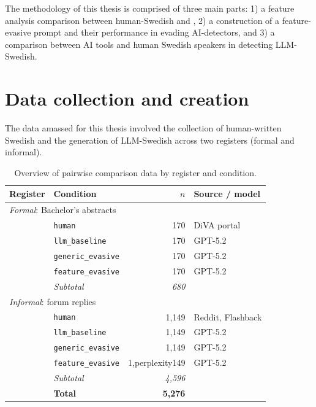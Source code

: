 \documentclass[thesis]{cluu}
\providecommand{\DIFadd}[1]{\texorpdfstring{\highLight[yellow]{#1}}{#1}} %
\providecommand{\DIFadd}[1]{#1} %
\providecommand{\DIFdel}[1]{} %
\providecommand{\DIFaddbegin}{} %
\providecommand{\DIFaddend}{} %
\providecommand{\DIFdelbegin}{} %
\providecommand{\DIFdelend}{} %
\begin{document}
The methodology of this thesis is comprised of three main parts: 1) a feature analysis comparison between human-Swedish and \DIFdelbegin \DIFdel{LLM-swedish}\DIFdelend \DIFaddbegin \DIFadd{LLM-Swedish}\DIFaddend , 2) a construction of a feature-evasive prompt and their performance in evading AI-detectors, and 3) a comparison between AI tools and human Swedish speakers in detecting LLM-Swedish.

\section{Data collection and creation}

The data amassed for this thesis involved the collection of human-written Swedish and the generation of LLM-Swedish across two registers (formal and informal).

\begin{table}[H]
  \centering
  \small
  \begin{tabular}{llrl}
    \toprule
    Register & Condition & $n$ & Source / model \\
    \midrule
    \multicolumn{4}{l}{\textit{Formal}: Bachelor's abstracts}\\
    \addlinespace[2pt]
    & \texttt{human}  & 170 & DiVA portal \\
    & \texttt{llm\_baseline} & 170 & GPT-5.2 \\
    & \texttt{generic\_evasive} & 170 & GPT-5.2 \\
    & \texttt{feature\_evasive} & 170 & GPT-5.2 \\
    \addlinespace[2pt]
    & \textit{Subtotal} & \textit{680} & \\
    \midrule
    \multicolumn{4}{l}{\textit{Informal}: forum replies}\\
    \addlinespace[2pt]
    & \texttt{human}   & 1{,}149 & Reddit, Flashback \\
    & \texttt{llm\_baseline}& 1{,}149 & GPT-5.2 \\
    & \texttt{generic\_evasive} & 1{,}149 & GPT-5.2 \\
    & \texttt{feature\_evasive} & 1{,perplexity}149 & GPT-5.2 \\
    \addlinespace[2pt]
    & \textit{Subtotal} & \textit{4{,}596} & \\
    \midrule
    & \textbf{Total} & \textbf{5{,}276} & \\
    \bottomrule
  \end{tabular}
    \label{tab:data-overview}
  \caption[Overview of the collected and generated data]{%
    Overview of pairwise comparison data by register and condition.}
  \begin{minipage}{\textwidth}
    \footnotesize
  \end{minipage}
\end{table}
\end{document}

